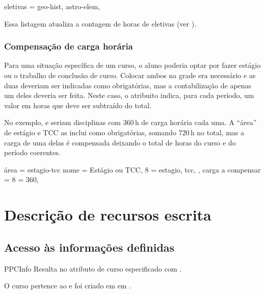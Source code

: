 \documentclass[a4paper, 11pt]{article}
\begin{document}
\begin{PDListing}
    eletivas = {geo-hist, astro-elem},
\end{PDListing}

Essa listagem atualiza a contagem de horas de eletivas (ver ).

\subsubsection*{Compensação de carga horária}\label{sec:compensacao-carga-horaria}
Para uma situação específica de um curso, o aluno poderia optar por fazer estágio ou o trabalho de conclusão de curso. Colocar ambos na grade era necessário e as duas deveriam ser indicadas como obrigatórias,  mas a contabilização de apenas um deles deveria ser feita. Neste caso, o atribuito  indica, para cada período, um valor em horas que deve ser subtraído do total.

No exemplo,  e  seriam disciplinas com 360\,h de carga horária cada uma. A ``área'' de estágio e TCC as inclui como obrigatórias, somando 720\,h no total, mas a carga de uma delas é compensada deixando o total de horas do curso e do período coerentes.

\begin{PDListing}
    área = {estagio-tcc}{
        nome = {Estágio ou TCC},
        8 = {estagio, tcc},  %
    },
    carga a compensar = {
        8 = 360,  %
    }
\end{PDListing}


\section{Descrição de recursos escrita}

\subsection{Acesso às informações definidas}

\begin{Macrodef}{PPCInfo}{}{}
    Resulta no atributo de curso especificado com .
\end{Macrodef}

\begin{PDExample}
    O curso pertence ao  e foi criado em em .
\end{PDExample}
\end{document}
